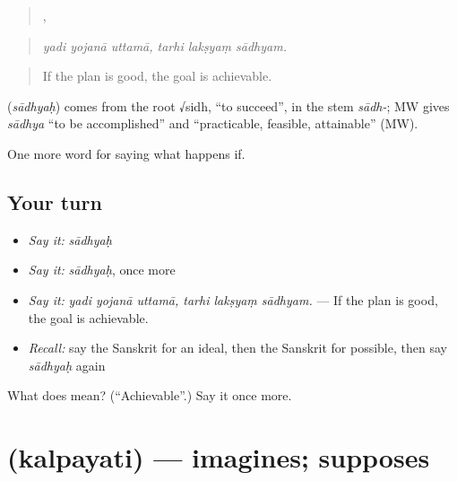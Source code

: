 \begin{quote}
  ,   
\end{quote}

\begin{quote}
\emph{yadi yojanā uttamā, tarhi lakṣyaṃ sādhyam.}
\end{quote}

\begin{quote}
If the plan is good, the goal is achievable.
\end{quote}

\begin{cousinweb}
\textbf{} (\emph{sādhyaḥ}) comes from the root √sidh, \textquotedblleft{}to succeed\textquotedblright{}, in the stem \emph{sādh-}; MW gives \emph{sādhya} \textquotedblleft{}to be accomplished\textquotedblright{} and \textquotedblleft{}practicable, feasible, attainable\textquotedblright{} (MW).
\end{cousinweb}

\begin{grammarlens}[title={What you've built}]
One more word for saying what happens if.
\end{grammarlens}

\subsection*{Your turn}
\begin{itemize}
\raggedright
  \item \emph{Say it:} \emph{sādhyaḥ}
  \item \emph{Say it:} \emph{sādhyaḥ}, once more
  \item \emph{Say it:} \emph{yadi yojanā uttamā, tarhi lakṣyaṃ sādhyam.} — If the plan is good, the goal is achievable.
  \item \emph{Recall:} say the Sanskrit for an ideal, then the Sanskrit for possible, then say \emph{sādhyaḥ} again
\end{itemize}

\begin{tcolorbox}[breakable,colback=teal!4,colframe=teal!35!black,title={Before you move on}]
What does  mean? (\textquotedblleft{}Achievable\textquotedblright{}.) Say it once more.
\end{tcolorbox}
\section[\texorpdfstring{\sk{कल्पयति} (kalpayati)}{कल्पयति (kalpayati)}]{ (kalpayati) — imagines; supposes}

